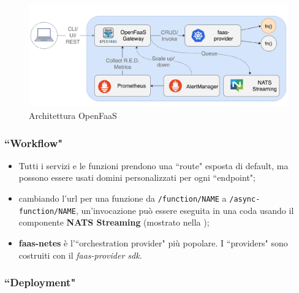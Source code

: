 \documentclass[12pt,a4paper,openany,twoside]{book}
\begin{document}
\begin{figure}[h]
    \centering
    \includegraphics[width=\linewidth]{figures/OpenFaaS_architecture.pdf}
    \caption{Architettura OpenFaaS}
    \label{fig:architettura-openfaas}
\end{figure}

\subsubsection{``Workflow"}

\begin{itemize}
    \item Tutti i servizi e le funzioni prendono una ``route" esposta di default, ma possono essere usati domini personalizzati per ogni ``endpoint";
    
    \item  cambiando l'\ac{url} per una funzione da \texttt{/function/NAME} a \texttt{/async-function/NAME}, un'invocazione può essere eseguita in una coda usando il componente \textbf{NATS Streaming} (mostrato nella );
    
    \item \textbf{faas-netes} è l'``orchestration provider" più popolare. I ``providers" sono costruiti con il \textit{faas-provider \ac{sdk}}.
\end{itemize}

\subsubsection{``Deployment"}
\end{document}
